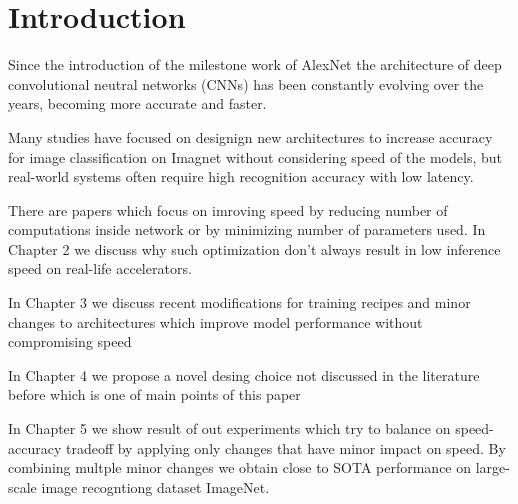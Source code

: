 



\chapter{Introduction}




Since the introduction of the milestone work of AlexNet \cite{alexnet??} the architecture of deep convolutional neutral networks (CNNs) has been constantly evolving over the years, becoming more accurate and faster. 

Many studies have focused on designign new architectures to increase accuracy for image classification on Imagnet without considering speed of the models, but real-world systems often require high recognition accuracy with low latency.

There are papers which focus on imroving speed by reducing number of computations inside network or by minimizing number of parameters used. In Chapter 2 we discuss why such optimization don't always result in low inference speed on real-life accelerators.


In Chapter 3 we discuss recent modifications for training recipes and minor changes to architectures which improve model performance without compromising speed

In Chapter 4 we propose a novel desing choice not discussed in the literature before which is one of main points of this paper

In Chapter 5 we show result of out experiments which try to balance on speed-accuracy tradeoff by applying only changes that have minor impact on speed. By combining multple minor changes we obtain close to SOTA performance on large-scale image recogntiong dataset ImageNet. 


